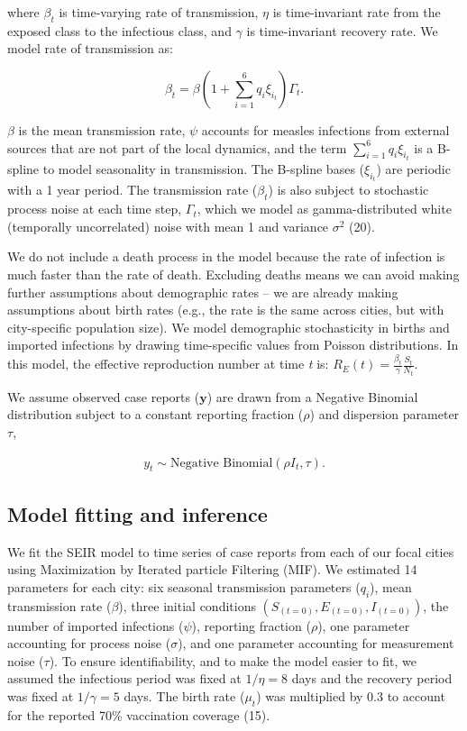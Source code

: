\documentclass[3p]{elsarticle} %
\begin{document}
\noindent{}where \(\beta_t\) is time-varying rate of transmission,
\(\eta\) is time-invariant rate from the exposed class to the infectious
class, and \(\gamma\) is time-invariant recovery rate. We model rate of
transmission as:

\begin{equation}
\beta_t = \beta \left(1 + \sum^6_{i=1} q_i \xi_{i_{t}} \right) \Gamma_t.
\end{equation}

\(\beta\) is the mean transmission rate, \(\psi\) accounts for measles
infections from external sources that are not part of the local
dynamics, and the term \(\sum^6_{i=1} q_i \xi_{i_{t}}\) is a B-spline to
model seasonality in transmission. The B-spline bases (\(\xi_{i_{t}}\))
are periodic with a 1 year period. The transmission rate (\(\beta_t\))
is also subject to stochastic process noise at each time step,
\(\Gamma_t\), which we model as gamma-distributed white (temporally
uncorrelated) noise with mean 1 and variance \(\sigma^2\) (20).

We do not include a death process in the model because the rate of
infection is much faster than the rate of death. Excluding deaths means
we can avoid making further assumptions about demographic rates -- we
are already making assumptions about birth rates (e.g., the rate is the
same across cities, but with city-specific population size). We model
demographic stochasticity in births and imported infections by drawing
time-specific values from Poisson distributions. In this model, the
effective reproduction number at time \emph{t} is:
\(R_E(t) = \frac{\beta_t}{\gamma} \frac{S_t}{N_t}\).

We assume observed case reports (\(\textbf{y}\)) are drawn from a
Negative Binomial distribution subject to a constant reporting fraction
(\(\rho\)) and dispersion parameter \(\tau\),

\begin{align}
y_t \sim \text{Negative Binomial} \left( \rho I_t, \tau \right).
\end{align}

\subsection{Model fitting and
inference}\label{model-fitting-and-inference}

We fit the SEIR model to time series of case reports from each of our
focal cities using Maximization by Iterated particle Filtering (MIF). We
estimated 14 parameters for each city: six seasonal transmission
parameters (\(q_i\)), mean transmission rate (\(\beta\)), three initial
conditions \(\left(S_{(t=0)},E_{(t=0)},I_{(t=0)}\right)\), the number of
imported infections (\(\psi\)), reporting fraction (\(\rho\)), one
parameter accounting for process noise (\(\sigma\)), and one parameter
accounting for measurement noise (\(\tau\)). To ensure identifiability,
and to make the model easier to fit, we assumed the infectious period
was fixed at \(1/\eta = 8\) days and the recovery period was fixed at
\(1/\gamma = 5\) days. The birth rate (\(\mu_t\)) was multiplied by 0.3
to account for the reported 70\% vaccination coverage (15).
\end{document}
